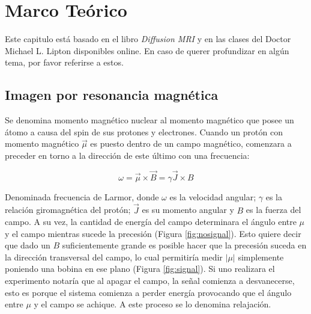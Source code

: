 \chapter{Marco Te\'orico}

Este capitulo est\'a basado en el libro \textit{Diffusion MRI} \cite{Basser2009}
y en las clases del Doctor Michael L. Lipton \cite{Lipton2014} disponibles online. 
En caso de querer profundizar en alg\'un tema, por favor referirse a estos. 

\section{Imagen por resonancia magnética}
Se denomina momento magn\'etico nuclear al momento magn\'etico que posee un 
\'atomo a causa del spin de sus protones y electrones. Cuando un prot\'on con 
momento magn\'etico $\vec{\mu}$ es puesto dentro de un campo magn\'etico, 
comenzara a preceder en torno a la direcci\'on de este \'ultimo con una 
frecuencia: 

$$ \omega = \vec{\mu} \times \vec{B} = \gamma \vec{J} \times B $$

Denominada frecuencia de Larmor, donde $\omega$ es la velocidad angular; $\gamma$ es
la relaci\'on giromagn\'etica del prot\'on; $\vec{J}$ es su momento angular y $B$
es la fuerza del campo. A su vez, la cantidad de energ\'ia del campo determinara
el \'angulo entre $\mu$ y el campo mientras sucede la precesi\'on
(Figura \ref{fig:nosignal}). Esto quiere decir que dado un $B$ suficientemente 
grande es posible hacer que la precesi\'on suceda en la direcci\'on transversal
del campo, lo cual permitir\'ia medir $|\mu|$ simplemente poniendo una bobina en
ese plano (Figura \ref{fig:signal}). Si uno realizara el experimento notar\'ia
que al apagar el campo, la se\~nal comienza a desvanecerse, esto es porque el
sistema comienza a perder energ\'ia provocando que el \'angulo entre $\mu$ y el
campo se achique. A este proceso se lo denomina relajaci\'on. \\

